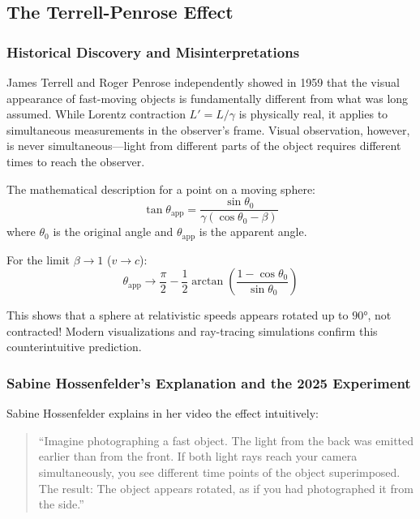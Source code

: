 	\subsection{The Terrell-Penrose Effect}
	
	\subsubsection{Historical Discovery and Misinterpretations}
	
	James Terrell \cite{terrell1959} and Roger Penrose \cite{penrose1959} independently showed in 1959 that the visual appearance of fast-moving objects is fundamentally different from what was long assumed. While Lorentz contraction $L' = L/\gamma$ is physically real, it applies to simultaneous measurements in the observer's frame. Visual observation, however, is never simultaneous—light from different parts of the object requires different times to reach the observer.
	
	The mathematical description for a point on a moving sphere:
	\begin{equation}
		\tan\theta_{\text{app}} = \frac{\sin\theta_0}{\gamma(\cos\theta_0 - \beta)}
	\end{equation}
	where $\theta_0$ is the original angle and $\theta_{\text{app}}$ is the apparent angle.
	
	For the limit $\beta \to 1$ ($v \to c$):
	\begin{equation}
		\theta_{\text{app}} \to \frac{\pi}{2} - \frac{1}{2}\arctan\left(\frac{1-\cos\theta_0}{\sin\theta_0}\right)
	\end{equation}
	
	This shows that a sphere at relativistic speeds appears rotated up to $90°$, not contracted! Modern visualizations \cite{weiskopf2000, mueller2014} and ray-tracing simulations confirm this counterintuitive prediction.
	
	\subsubsection{Sabine Hossenfelder's Explanation and the 2025 Experiment}
	
	Sabine Hossenfelder explains in her video \cite{hossenfelder2025} the effect intuitively:
	
	\begin{quote}
		``Imagine photographing a fast object. The light from the back was emitted earlier than from the front. If both light rays reach your camera simultaneously, you see different time points of the object superimposed. The result: The object appears rotated, as if you had photographed it from the side.''
	\end{quote}
	
